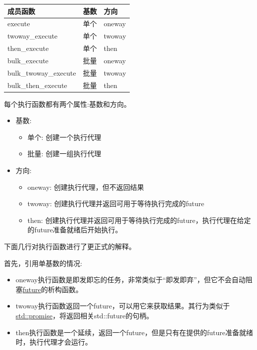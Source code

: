 \begin{table}[H]
\centering
\begin{tabular}{lll}
\textbf{成员函数} & \textbf{基数} & \textbf{方向} \\ \hline
execute                  & 单个               & oneway             \\
twoway\_execute          & 单个               & twoway             \\
then\_execute            & 单个               & then               \\
bulk\_execute            & 批量                 & oneway             \\
bulk\_twoway\_execute    & 批量                 & twoway             \\
bulk\_then\_execute      & 批量                 & then              
\end{tabular}
\end{table}

每个执行函数都有两个属性:基数和方向。

\begin{itemize}
\item 
基数:
\begin{itemize}
\item 
单个: 创建一个执行代理

\item 
批量: 创建一组执行代理
\end{itemize}

\item 
方向:
\begin{itemize}
\item 
oneway: 创建执行代理，但不返回结果

\item
twoway: 创建执行代理并返回可用于等待执行完成的future

\item
then: 创建执行代理并返回可用于等待执行完成的future，执行代理在给定的future准备就绪后开始执行。
\end{itemize}
\end{itemize}

下面几行对执行函数进行了更正式的解释。

首先，引用单基数的情况:

\begin{itemize}
\item 
oneway执行函数是即发即忘的任务，非常类似于“即发即弃”，但它不会自动阻塞\href{https://www.modernescpp.com/index.php/the-special-futures}{future}的析构函数。

\item
twoway执行函数返回一个future，可以用它来获取结果。其行为类似于\href{https://www.modernescpp.com/index.php/promise-and-future}{std::promise}，将返回相关std::future的句柄。

\item
then执行函数是一个延续，返回一个future，但是只有在提供的future准备就绪时，执行代理才会运行。
\end{itemize}

